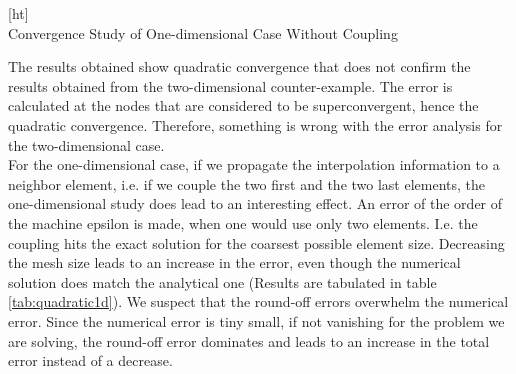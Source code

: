 \documentclass[a4paper,12pt]{article}
\makeatletter
\newenvironment{figurehere}
  {\def\@captype{figure}}
  {}
\makeatother
\begin{document}
\begin{figurehere}[ht]
\centering
{}\\
\caption{Convergence Study of One-dimensional Case Without Coupling}\label{fig:lin1d}
\end{figurehere}
The results obtained show quadratic convergence that does not confirm the results obtained from the two-dimensional counter-example. The error is calculated at the nodes that are considered to be superconvergent, hence the quadratic convergence. Therefore, something is wrong with the error analysis for the two-dimensional case.\\
For the one-dimensional case, if we propagate the interpolation information to a neighbor element, i.e. if we couple the two first and the two last elements, the one-dimensional study does lead to an interesting effect. An error of the order of the machine epsilon is made, when one would use only two elements. I.e. the coupling hits the exact solution for the coarsest possible element size. Decreasing the mesh size leads to an increase in the error, even though the numerical solution does match the analytical one (Results are tabulated in table \ref{tab:quadratic1d}). We suspect that the round-off errors overwhelm the numerical error. Since the numerical error is tiny small, if not vanishing for the problem we are solving, the round-off error dominates and leads to an increase in the total error instead of a decrease.\\
\end{document}
